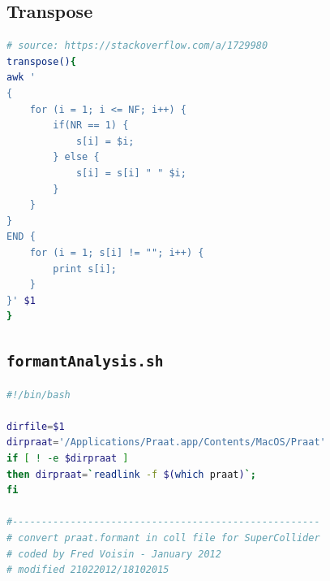 \documentclass{book}
\begin{document}
\makeatletter
\setlength{\@fptop}{0pt}
\makeatother


\subsection{Transpose}
\label{trans}
\begin{lstlisting}[language=bash]
# source: https://stackoverflow.com/a/1729980
transpose(){
awk '
{
    for (i = 1; i <= NF; i++) {
        if(NR == 1) {
            s[i] = $i;
        } else {
            s[i] = s[i] " " $i;
        }
    }
}
END {
    for (i = 1; s[i] != ""; i++) {
        print s[i];
    }
}' $1
}
\end{lstlisting}


\subsection{\texttt{formantAnalysis.sh}}
\label{fab}

\begin{lstlisting}[basicstyle=\footnotesize\ttfamily,language=Bash]
#!/bin/bash

dirfile=$1
dirpraat='/Applications/Praat.app/Contents/MacOS/Praat'
if [ ! -e $dirpraat ]
then dirpraat=`readlink -f $(which praat)`;
fi

#-----------------------------------------------------
# convert praat.formant in coll file for SuperCollider
# coded by Fred Voisin - January 2012 
# modified 21022012/18102015
\end{lstlisting}
\end{document}

